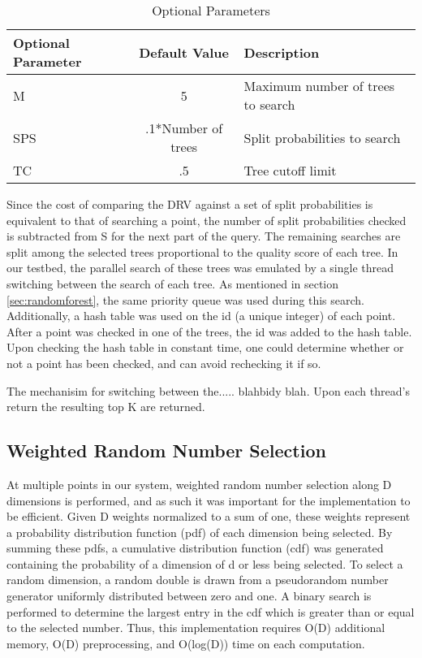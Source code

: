 \begin{table}
\centering
\begin{tabular}{ | l | c | l |}
	\hline
	Optional Parameter & Default Value & Description \\
	\hline
	M & 5 & Maximum number of trees to search \\
	\hline
	SPS & .1*Number of trees & Split probabilities to search \\
	\hline
	TC & .5 & Tree cutoff limit \\ 
	\hline
\end{tabular}
\caption{Optional Parameters}
\label{table:annparam}
\end{table}

Since the cost of comparing the DRV against a set of split probabilities is equivalent to that of searching a point, the number of split probabilities checked is subtracted from S for the next part of the query.  The remaining searches are split among the selected trees proportional to the quality score of each tree.  In our testbed, the parallel search of these trees was emulated by a single thread switching between the search of each tree.  As mentioned in section \ref{sec:randomforest}, the same priority queue was used during this search.  Additionally, a hash table was used on the id (a unique integer) of each point.  After a point was checked in one of the trees, the id was added to the hash table.  Upon checking the hash table in constant time, one could determine whether or not a point has been checked, and can avoid rechecking it if so.

The mechanisim for switching between the..... blahbidy blah.  Upon each thread's return the resulting top K are returned.  

\subsection{Weighted Random Number Selection}
\label{sec:rng}

At multiple points in our system, weighted random number selection along D dimensions is performed, and as such it was important for the implementation to be efficient.  Given D weights normalized to a sum of one, these weights represent a probability distribution function (pdf) of each dimension being selected.  By summing these pdfs, a cumulative distribution function (cdf) was generated containing the probability of a dimension of d or less being selected.  To select a random dimension, a random double is drawn from a pseudorandom number generator uniformly distributed between zero and one.  A binary search is performed to determine the largest entry in the cdf which is greater than or equal to the selected number.  Thus, this implementation requires O(D) additional memory, O(D) preprocessing, and O(log(D)) time on each computation.